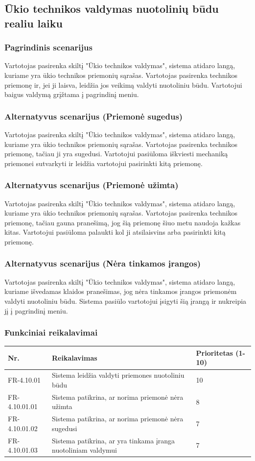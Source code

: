 \documentclass[oneside]{VUMIFPSkursinis}
\begin{document}
\subsection{Ūkio technikos valdymas nuotolinių būdu realiu laiku}
\subsubsection{Pagrindinis scenarijus}
	Vartotojas pasirenka skiltį "Ūkio technikos valdymas", sistema atidaro langą, kuriame yra ūkio technikos priemonių sąrašas. Vartotojas pasirenka technikos priemonę ir, jei ji laisva, leidžia jos veikimą valdyti nuotoliniu būdu. Vartotojui baigus valdymą grįžtama į pagrindinį meniu.
\subsubsection{Alternatyvus scenarijus (Priemonė sugedus)}
	Vartotojas pasirenka skiltį "Ūkio technikos valdymas", sistema atidaro langą, kuriame yra ūkio technikos priemonių sąrašas. Vartotojas pasirenka technikos priemonę, tačiau ji yra sugedusi. Vartotojui pasiūloma iškviesti mechaniką priemonei sutvarkyti ir leidžia vartotojui pasirinkti kitą priemonę.
\subsubsection{Alternatyvus scenarijus (Priemonė užimta)}
	Vartotojas pasirenka skiltį "Ūkio technikos valdymas", sistema atidaro langą, kuriame yra ūkio technikos priemonių sąrašas. Vartotojas pasirenka technikos priemonę, tačiau gauna pranešimą, jog šią priemonę šiuo metu naudoja kažkas kitas. Vartotojui pasiūloma palaukti kol ji atsilaisvins arba pasirinkti kitą priemonę.
\subsubsection{Alternatyvus scenarijus (Nėra tinkamos įrangos)}
	Vartotojas pasirenka skiltį "Ūkio technikos valdymas", sistema atidaro langą, kuriame išvedamas klaidos pranešimas, jog nėra tinkamos įrangos priemonėm valdyti nuotoliniu būdu. Sistema pasiūlo vartotojui įsigyti šią įrangą ir nukreipia jį į pagrindinį meniu.
\pagebreak
\subsubsection{Funkciniai reikalavimai}
\begin{table}[htbp]
	\begin{tabularx}{1\textwidth}{ |P{2.5cm}|X|P{3cm }| }  \hline
           	Nr. & Reikalavimas &  Prioritetas (1-10)  \\   \hline 
         		FR-4.10.01 & Sistema leidžia valdyti priemones nuotoliniu būdu & 10  \\   \hline
		FR-4.10.01.01 & Sistema patikrina, ar norima priemonė nėra užimta & 8  \\ \hline
		FR-4.10.01.02 & Sistema patikrina, ar norima priemonė nėra sugedusi & 7 \\ \hline
		FR-4.10.01.03 & Sistema patikrina, ar yra tinkama įranga nuotoliniam valdymui & 7 \\  \hline
	\end{tabularx}
\end{table}
\end{document}
